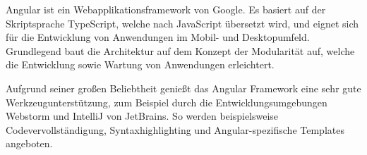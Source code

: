


Angular ist ein Webapplikationsframework von Google. Es basiert auf der Skriptsprache TypeScript, welche nach JavaScript übersetzt wird, und eignet sich für die Entwicklung von Anwendungen im Mobil- und Desktopumfeld. Grundlegend baut die Architektur auf dem Konzept der Modularität auf, welche die Entwicklung sowie Wartung von Anwendungen erleichtert.

Aufgrund seiner großen Beliebtheit genießt das Angular Framework eine sehr gute Werkzeugunterstützung, zum Beispiel durch die Entwicklungsumgebungen Webstorm und IntelliJ von JetBrains. So werden beispielsweise Codevervollständigung, Syntaxhighlighting und Angular-spezifische Templates angeboten.
\cite{angularIO}
